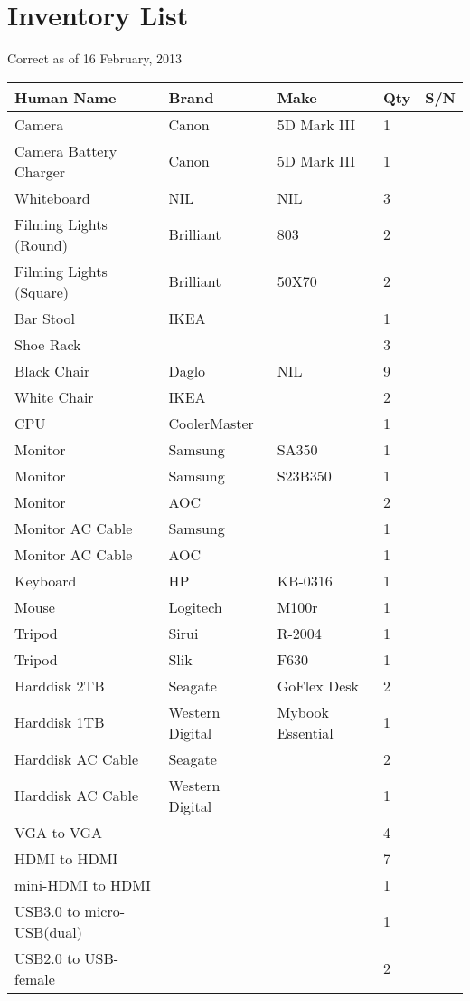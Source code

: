 \documentclass[DIV=classic,11pt,abstracton,numbers=noenddot,listof=totoc,bibliography=totoc,parskip]{scrartcl}
\begin{document}
\section*{Inventory List}
Correct as of 16 February, 2013
\begin{longtabu} to \linewidth {X[2,l]X[1.2,l]X[1,c]X[1,l]X[1,l]}
\toprule
\textbf{Human Name} & \textbf{Brand} & \textbf{Make} & \textbf{Qty} & \textbf{S/N}\\ \midrule\endhead
Camera & Canon & 5D Mark III & 1 & \\
Camera Battery Charger & Canon & 5D Mark III & 1 & \\
Whiteboard & NIL & NIL & 3 & \\
Filming Lights (Round) & Brilliant & 803 & 2 & \\
Filming Lights (Square) & Brilliant & 50X70 & 2 & \\
Bar Stool & IKEA & & 1 & \\
Shoe Rack &  & & 3 & \\
Black Chair & Daglo & NIL & 9 & \\
White Chair & IKEA & & 2 & \\
CPU & CoolerMaster &  & 1 & \\
Monitor & Samsung & SA350 & 1 & \\
Monitor & Samsung & S23B350 & 1 & \\
Monitor & AOC && 2 & \\
Monitor AC Cable & Samsung && 1 & \\
Monitor AC Cable & AOC && 1 & \\ 
Keyboard & HP & KB-0316 & 1 & \\
Mouse & Logitech & M100r & 1 & \\
Tripod & Sirui & R-2004 & 1 & \\
Tripod & Slik & F630 & 1 & \\
Harddisk 2TB & Seagate & GoFlex Desk & 2 & \\ 
Harddisk 1TB & Western Digital & Mybook Essential & 1 & \\
Harddisk AC Cable & Seagate && 2 & \\
Harddisk AC Cable & Western Digital && 1 & \\
VGA to VGA &&& 4 & \\
HDMI to HDMI &&& 7 & \\
mini-HDMI to HDMI &&& 1 &\\
USB3.0 to micro-USB(dual) &&& 1 & \\
USB2.0 to USB-female &&& 2 & \\

\end{longtabu}
\end{document}
